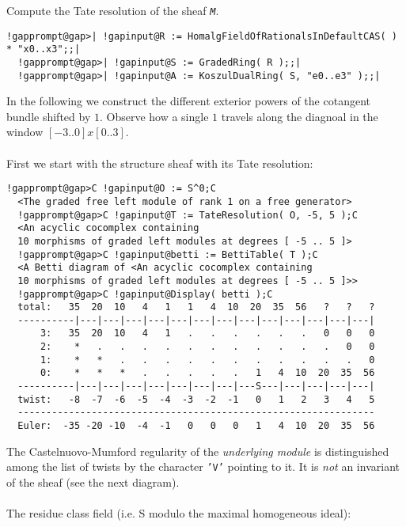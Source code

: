 \documentclass[a4paper,11pt]{report}
\begin{document}
{{{ Compute the Tate resolution of the sheaf \mbox{\texttt{\mdseries\slshape M}}. 
\begin{Verbatim}[commandchars=!@|,fontsize=\small,frame=single,label=Example]
  !gapprompt@gap>| !gapinput@R := HomalgFieldOfRationalsInDefaultCAS( ) * "x0..x3";;|
  !gapprompt@gap>| !gapinput@S := GradedRing( R );;|
  !gapprompt@gap>| !gapinput@A := KoszulDualRing( S, "e0..e3" );;|
\end{Verbatim}
 In the following we construct the different exterior powers of the cotangent
bundle shifted by $1$. Observe how a single $1$ travels along the diagnoal in the window $[ -3 .. 0 ] x [ 0 .. 3 ]$. \\
\\
 First we start with the structure sheaf with its Tate resolution: 
\begin{Verbatim}[commandchars=!@C,fontsize=\small,frame=single,label=Example]
  !gapprompt@gap>C !gapinput@O := S^0;C
  <The graded free left module of rank 1 on a free generator>
  !gapprompt@gap>C !gapinput@T := TateResolution( O, -5, 5 );C
  <An acyclic cocomplex containing
  10 morphisms of graded left modules at degrees [ -5 .. 5 ]>
  !gapprompt@gap>C !gapinput@betti := BettiTable( T );C
  <A Betti diagram of <An acyclic cocomplex containing 
  10 morphisms of graded left modules at degrees [ -5 .. 5 ]>>
  !gapprompt@gap>C !gapinput@Display( betti );C
  total:   35  20  10   4   1   1   4  10  20  35  56   ?   ?   ?
  ----------|---|---|---|---|---|---|---|---|---|---|---|---|---|
      3:   35  20  10   4   1   .   .   .   .   .   .   0   0   0
      2:    *   .   .   .   .   .   .   .   .   .   .   .   0   0
      1:    *   *   .   .   .   .   .   .   .   .   .   .   .   0
      0:    *   *   *   .   .   .   .   .   1   4  10  20  35  56
  ----------|---|---|---|---|---|---|---|---S---|---|---|---|---|
  twist:   -8  -7  -6  -5  -4  -3  -2  -1   0   1   2   3   4   5
  ---------------------------------------------------------------
  Euler:  -35 -20 -10  -4  -1   0   0   0   1   4  10  20  35  56
\end{Verbatim}
 The Castelnuovo-Mumford regularity of the \emph{underlying module} is distinguished among the list of twists by the character \texttt{'V'} pointing to it. It is \emph{not} an invariant of the sheaf (see the next diagram). \\
\\
 The residue class field (i.e. S modulo the maximal homogeneous ideal): 
\begin{Verbatim}[commandchars=!@|,fontsize=\small,frame=single,label=Example]

\end{Verbatim}}}}
\end{document}
